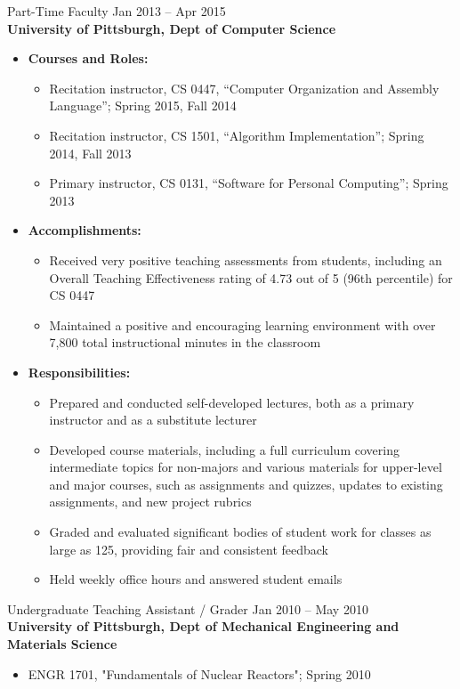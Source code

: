 \documentclass[11pt]{article}
\begin{document}
\selectfont
Part-Time Faculty
	\hfill Jan 2013 -- Apr 2015 \\
\normalfont
\textbf{University of Pittsburgh, Dept of Computer Science}
\begin{itemize}
	\item \textbf{Courses and Roles:}
		\begin{itemize}
			\item Recitation instructor, CS 0447, ``Computer Organization and Assembly Language'';
				Spring 2015, Fall 2014
			\item Recitation instructor, CS 1501, ``Algorithm Implementation'';
				Spring 2014, Fall 2013
			\item Primary instructor, CS 0131, ``Software for Personal Computing'';
				Spring 2013
		\end{itemize}
	\item \textbf{Accomplishments:}
		\begin{itemize}
			\item Received very positive teaching assessments from students,
				including an Overall Teaching Effectiveness rating of 4.73 out of 5
				(96th percentile) for CS 0447
			\item Maintained a positive and encouraging learning environment
				with over 7,800 total instructional minutes in the classroom
		\end{itemize}
	\item \textbf{Responsibilities:}
		\begin{itemize}
			\item Prepared and conducted self-developed lectures,
				both as a primary instructor and as a substitute lecturer
			\item Developed course materials, including a full curriculum
				covering intermediate topics for non-majors
				and various materials for upper-level and major courses,
				such as assignments and quizzes, updates to existing assignments,
				and new project rubrics
			\item Graded and evaluated significant bodies of student work
				for classes as large as 125, providing fair and consistent feedback
			\item Held weekly office hours and answered student emails
		\end{itemize}
\end{itemize}

\selectfont
Undergraduate Teaching Assistant / Grader
	\hfill Jan 2010 -- May 2010 \\
\normalfont
\textbf{University of Pittsburgh, Dept of Mechanical Engineering and Materials Science}
\begin{itemize}
	\item ENGR 1701, "Fundamentals of Nuclear Reactors"; Spring 2010
\end{itemize}
\end{document}
